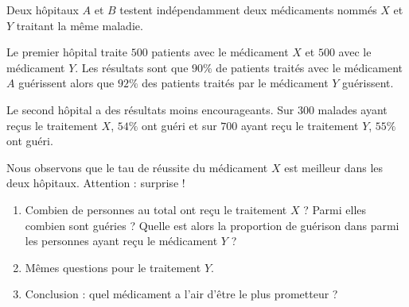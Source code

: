 
\begin{exercice}\label{exosmath-0090}

    Deux hôpitaux \( A\) et \( B\) testent indépendamment deux médicaments nommés \( X\) et \( Y\) traitant la même maladie.
    
    Le premier hôpital traite \( 500\) patients avec le médicament \( X\) et \( 500\) avec le médicament \( Y\). Les résultats sont que \( 90\%\) de patients traités avec le médicament \( A\) guérissent alors que \( 92\%\) des patients traités par le médicament \( Y\) guérissent.

    Le second hôpital a des résultats moins encourageants. Sur \( 300\) malades ayant reçus le traitement \( X\), \( 54\%\) ont guéri et sur \( 700\) ayant reçu le traitement \( Y\), \( 55\%\) ont guéri.

    Nous observons que le tau de réussite du médicament \( X\) est meilleur dans les deux hôpitaux. Attention : surprise !

    \begin{enumerate}
        \item
            Combien de personnes au total ont reçu le traitement $X$ ? Parmi elles combien sont guéries ? Quelle est alors la proportion de guérison dans parmi les personnes ayant reçu le médicament \( Y\) ?
        \item
            Mêmes questions pour le traitement \( Y\).
        \item
            Conclusion : quel médicament a l'air d'être le plus prometteur ?
    \end{enumerate}

\end{exercice}
